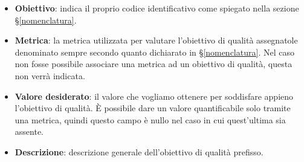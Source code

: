 \begin{itemize}
	\item \textbf{Obiettivo}: indica il proprio codice identificativo come spiegato nella sezione \S\ref{nomenclatura}.
	\item \textbf{Metrica}: la metrica utilizzata per valutare l'obiettivo di qualità assegnatole denominato sempre secondo quanto dichiarato in \S\ref{nomenclatura}. Nel caso non fosse possibile associare una metrica ad un obiettivo di qualità, questa non verrà indicata.
	\item \textbf{Valore desiderato}: il valore che vogliamo ottenere per soddisfare appieno l'obiettivo di qualità. È possibile dare un valore quantificabile solo tramite una metrica, quindi questo campo è nullo nel caso in cui quest'ultima sia assente.
	\item \textbf{Descrizione}: descrizione generale dell'obiettivo di qualità prefisso.
\end{itemize}

\newcommand{\grigiodesc}{gray!15}

